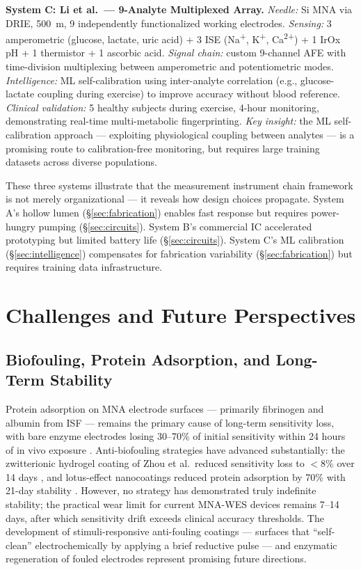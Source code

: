 \documentclass[review,1p]{elsarticle}
\begin{document}
\textbf{System C: Li et al.\ — 9-Analyte Multiplexed Array.}
\textit{Needle:} Si MNA via DRIE, 500~\textmu{}m, 9 independently functionalized working electrodes. \textit{Sensing:} 3 amperometric (glucose, lactate, uric acid) + 3 ISE (Na\textsuperscript{+}, K\textsuperscript{+}, Ca\textsuperscript{2+}) + 1 IrOx pH + 1 thermistor + 1 ascorbic acid. \textit{Signal chain:} custom 9-channel AFE with time-division multiplexing between amperometric and potentiometric modes. \textit{Intelligence:} ML self-calibration using inter-analyte correlation (e.g., glucose-lactate coupling during exercise) to improve accuracy without blood reference. \textit{Clinical validation:} 5 healthy subjects during exercise, 4-hour monitoring, demonstrating real-time multi-metabolic fingerprinting. \textit{Key insight:} the ML self-calibration approach — exploiting physiological coupling between analytes — is a promising route to calibration-free monitoring, but requires large training datasets across diverse populations.

These three systems illustrate that the measurement instrument chain framework is not merely organizational — it reveals how design choices propagate. System A's hollow lumen (§\ref{sec:fabrication}) enables fast response but requires power-hungry pumping (§\ref{sec:circuits}). System B's commercial IC accelerated prototyping but limited battery life (§\ref{sec:circuits}). System C's ML calibration (§\ref{sec:intelligence}) compensates for fabrication variability (§\ref{sec:fabrication}) but requires training data infrastructure.


\section{Challenges and Future Perspectives}
\label{sec:challenges}

\subsection{Biofouling, Protein Adsorption, and Long-Term Stability}
\label{subsec:biofouling}

Protein adsorption on MNA electrode surfaces — primarily fibrinogen and albumin from ISF — remains the primary cause of long-term sensitivity loss, with bare enzyme electrodes losing 30--70\% of initial sensitivity within 24 hours of in vivo exposure \cite{Ryu2022Lotus}. Anti-biofouling strategies have advanced substantially: the zwitterionic hydrogel coating of Zhou et al.\ reduced sensitivity loss to $<$8\% over 14 days \cite{Zhou2024}, and lotus-effect nanocoatings reduced protein adsorption by 70\% with 21-day stability \cite{Ryu2022Lotus}. However, no strategy has demonstrated truly indefinite stability; the practical wear limit for current MNA-WES devices remains 7--14 days, after which sensitivity drift exceeds clinical accuracy thresholds. The development of stimuli-responsive anti-fouling coatings — surfaces that ``self-clean'' electrochemically by applying a brief reductive pulse — and enzymatic regeneration of fouled electrodes represent promising future directions.
\end{document}
